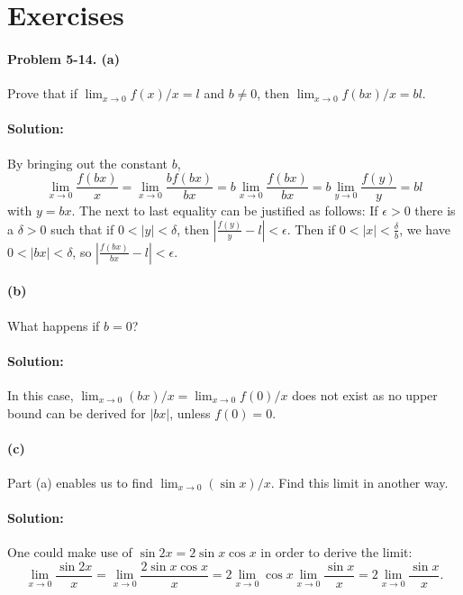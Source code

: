 \documentclass{article}
\begin{document}
\section*{Exercises}

\paragraph{Problem 5-14. (a)} Prove that if $\lim_{x \rightarrow 0} f(x)/x = l$
and $b \neq 0$, then $\lim_{x \rightarrow 0}f(bx)/x = bl$.

\paragraph{Solution:} By bringing out the constant $b$, \begin{equation*}
  \lim_{x \rightarrow 0}\frac{f(bx)}{x} = \lim_{x \rightarrow 0}
    \frac{bf(bx)}{bx} = b\lim_{x \rightarrow 0}\frac{f(bx)}{bx} =
    b\lim_{y \rightarrow 0}\frac{f(y)}{y} = bl
\end{equation*} with $y = bx$.
The next to last equality can be justified as follows: If $\epsilon > 0$ there
is a $\delta > 0$ such that if $0 < |y| < \delta$, then $\left|\frac{f(y)}{y} -
l\right| < \epsilon$. Then if $0 < |x| < \frac{\delta}{b}$, we have $0 < |bx| <
\delta$, so $\left|\frac{f(bx)}{bx} - l\right| < \epsilon$.

\paragraph{(b)} What happens if $b = 0$?

\paragraph{Solution:} In this case, $\lim_{x \rightarrow 0} (bx)/x =
\lim_{x \rightarrow 0} f(0)/x$ does not exist as no upper bound can be derived
for $|bx|$, unless $f(0) = 0$.

\paragraph{(c)} Part (a) enables us to find $\lim_{x \rightarrow 0}
(\sin{x})/x$. Find this limit in another way.

\paragraph{Solution:} One could make use of $\sin{2x} = 2\sin{x}\cos{x}$ in
order to derive the limit: \begin{equation*}
  \lim_{x \rightarrow 0}\frac{\sin{2x}}{x} = \lim_{x \rightarrow 0}\frac{2
    \sin{x}\cos{x}}{x} = 2\lim_{x \rightarrow 0}\cos{x}\lim_{x \rightarrow 0}
    \frac{\sin{x}}{x} = 2\lim_{x \rightarrow 0}\frac{\sin{x}}{x}.
\end{equation*}
\end{document}
